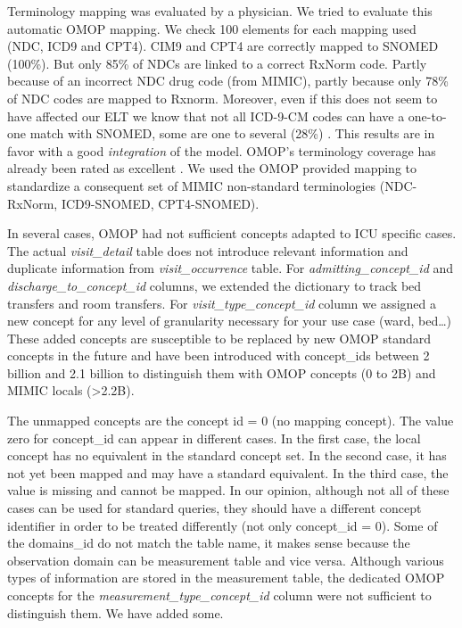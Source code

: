 Terminology mapping was evaluated by a physician. 
We tried to evaluate this automatic OMOP mapping. We check 100 elements for each 
mapping used (NDC, ICD9 and CPT4). CIM9 and CPT4 are correctly mapped to SNOMED 
(100\%). But only 85\% of NDCs are linked to a correct RxNorm code. 
Partly because of an incorrect NDC drug code (from MIMIC), partly because only 78\% 
of NDC codes are mapped to Rxnorm. Moreover, even if this does not seem to have 
affected our ELT we know that not all ICD-9-CM codes can have a one-to-one match 
with SNOMED, some are one to several (28\%) \cite{snomed-icd9}.
This results are in favor with a good \textit{integration} of the model.
OMOP's terminology coverage has already been rated as excellent
\cite{omop-vs-pcornet}. We used the OMOP provided mapping to standardize a
consequent set of MIMIC non-standard terminologies (NDC-RxNorm, ICD9-SNOMED,
CPT4-SNOMED). 

In several cases, OMOP had not sufficient concepts adapted to ICU specific
cases. The actual \textit{visit\_detail} table does not introduce relevant
information and duplicate information from \textit{visit\_occurrence} table.
For \textit{admitting\_concept\_id} and \textit{discharge\_to\_concept\_id}
columns, we extended the dictionary to track bed transfers and room transfers.
For \textit{visit\_type\_concept\_id} column we assigned a new concept for any
level of granularity necessary for your use case (ward, bed\ldots) These added
concepts are susceptible to be replaced by new OMOP standard concepts in the
future and have been introduced with concept\_ids between 2 billion and 2.1
billion to distinguish them with OMOP concepts (0 to 2B) and MIMIC locals
(>2.2B).

The unmapped concepts are the concept id = 0 (no mapping concept).  The value
zero for concept\_id can appear in different cases. In the first case, the
local concept has no equivalent in the standard concept set. In the second
case, it has not yet been mapped and may have a standard equivalent. In the
third case, the value is missing and cannot be mapped. In our opinion, although
not all of these cases can be used for standard queries, they should have a
different concept identifier in order to be treated differently (not only
concept\_id = 0). Some of the domains\_id do not match the table name, it makes
sense because the observation domain can be measurement table and vice versa.
Although various types of information are stored in the measurement table, the
dedicated OMOP concepts for the \textit{measurement\_type\_concept\_id} column
were not sufficient to distinguish them. We have added some. 

